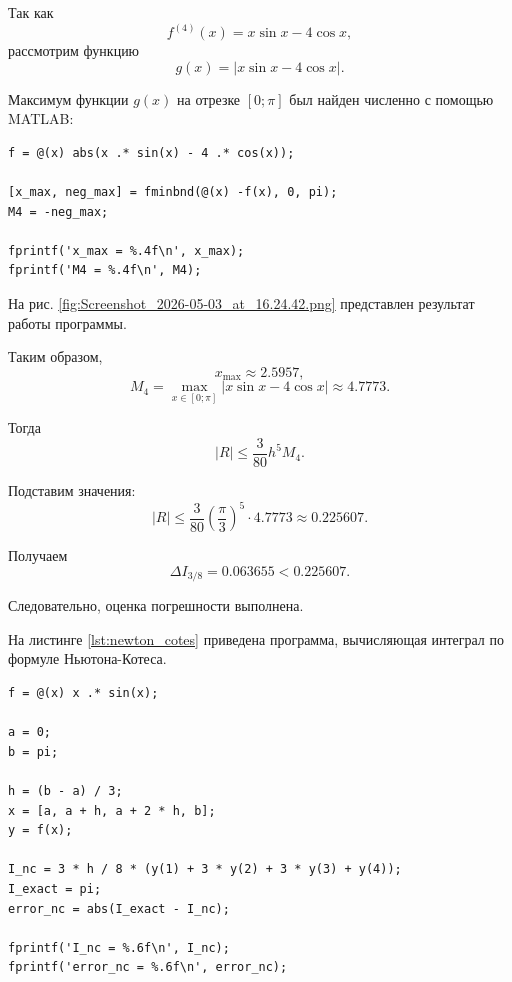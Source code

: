Так как
\[
f^{(4)}(x)=x\sin x-4\cos x,
\]
рассмотрим функцию
\[
g(x)=|x\sin x-4\cos x|.
\]

Максимум функции $g(x)$ на отрезке $[0;\pi]$ был найден численно с помощью MATLAB:

\begin{listing}[H]
\caption{Нахождение максимума $|f^{(4)}(x)|$}
\vspace{-20pt}
\begin{verbatim}
f = @(x) abs(x .* sin(x) - 4 .* cos(x));

[x_max, neg_max] = fminbnd(@(x) -f(x), 0, pi);
M4 = -neg_max;

fprintf('x_max = %.4f\n', x_max);
fprintf('M4 = %.4f\n', M4);
\end{verbatim}
\end{listing}

На рис. \ref{fig:Screenshot_2026-05-03_at_16.24.42.png} представлен результат работы программы.


Таким образом,
\[
x_{\max}\approx 2.5957,
\]
\[
M_4=\max_{x\in[0;\pi]} |x\sin x-4\cos x|\approx 4.7773.
\]

Тогда
\[
|R|\leq\frac{3}{80}h^5M_4.
\]

Подставим значения:
\[
|R|\leq\frac{3}{80}\left(\frac{\pi}{3}\right)^5\cdot4.7773\approx0.225607.
\]

Получаем
\[
\Delta I_{3/8}=0.063655<0.225607.
\]

Следовательно, оценка погрешности выполнена.

На листинге \ref{lst:newton_cotes} приведена программа, вычисляющая интеграл по формуле Ньютона-Котеса.

\begin{listing}[H]
\caption{Вычисление интеграла по формуле Ньютона-Котеса}
\vspace{-20pt}
\label{lst:newton_cotes}
\begin{verbatim}
f = @(x) x .* sin(x);

a = 0;
b = pi;

h = (b - a) / 3;
x = [a, a + h, a + 2 * h, b];
y = f(x);

I_nc = 3 * h / 8 * (y(1) + 3 * y(2) + 3 * y(3) + y(4));
I_exact = pi;
error_nc = abs(I_exact - I_nc);

fprintf('I_nc = %.6f\n', I_nc);
fprintf('error_nc = %.6f\n', error_nc);
\end{verbatim}
\end{listing}

